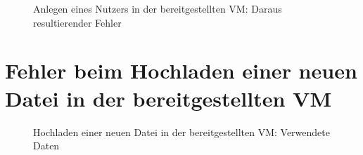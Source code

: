\documentclass[12pt,DIV14,BCOR10mm,a4paper,parskip=half-,headsepline,headinclude,english,ngerman,bibliography=totocnumbered]{scrreprt}
\begin{document}
\begin{enumerate}
\begin{appendices}
\begin{figure}[!htb]
  \centering
    \label{createuser_fail_2}
    \caption{Anlegen eines Nutzers in der bereitgestellten VM: Daraus resultierender Fehler}
\end{figure}

\chapter{Fehler beim Hochladen einer neuen Datei in der bereitgestellten VM}

\begin{figure}[!htb]
  \centering
    \label{upload_fail_2}
    \caption{Hochladen einer neuen Datei in der bereitgestellten VM: Verwendete Daten}
  \end{figure}


\end{appendices}
\end{enumerate}
\end{document}
